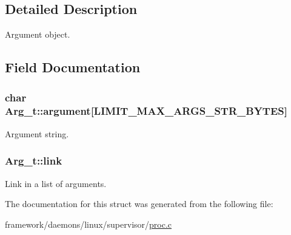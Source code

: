 \subsection{Detailed Description}
Argument object. 

\subsection{Field Documentation}
\subsubsection[{\texorpdfstring{argument}{argument}}]{\setlength{\rightskip}{0pt plus 5cm}char Arg\+\_\+t\+::argument\mbox{[}{\bf L\+I\+M\+I\+T\+\_\+\+M\+A\+X\+\_\+\+A\+R\+G\+S\+\_\+\+S\+T\+R\+\_\+\+B\+Y\+T\+ES}\mbox{]}}\hypertarget{struct_arg__t_a3833ee81ada43b713e503c1db3ecd7be}{}\label{struct_arg__t_a3833ee81ada43b713e503c1db3ecd7be}


Argument string. 

\subsubsection[{\texorpdfstring{link}{link}}]{ Arg\+\_\+t\+::link}\hypertarget{struct_arg__t_a661113a2077bc1d29dbf9b64fdb30804}{}\label{struct_arg__t_a661113a2077bc1d29dbf9b64fdb30804}


Link in a list of arguments. 



The documentation for this struct was generated from the following file\+:\begin{DoxyCompactItemize}
\item 
framework/daemons/linux/supervisor/\hyperlink{proc_8c}{proc.\+c}\end{DoxyCompactItemize}
